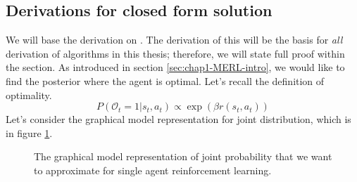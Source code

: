 \subsection{Derivations for closed form solution}
\label{sec:chap2-derivation-soft-closed-form}

We will base the derivation on \cite{levine2018reinforcement}. The derivation of this will be the basis for \textit{all} derivation of algorithms in this thesis; therefore, we will state full proof within the section. As introduced in section \ref{sec:chap1-MERL-intro}, we would like to find the posterior where the agent is optimal. Let's recall the definition of optimality. 
\begin{equation}
    P(\mathcal{O}_t = 1 | s_t, a_t) \propto \exp (\beta r (s_t, a_t))
\end{equation}
Let's consider the graphical model representation for joint distribution, which is in figure \ref{fig:chap2-single-graphical-optim}. 
\begin{figure}[ht]
    \begin{minipage}[t]{0.5\linewidth}
    \centering
    \end{minipage}%
    \begin{minipage}[t]{0.5\linewidth}
    \caption{The graphical model representation of joint probability that we want to approximate for single agent reinforcement learning.}
    \label{fig:chap2-single-graphical-optim}
    \end{minipage}
\end{figure}
